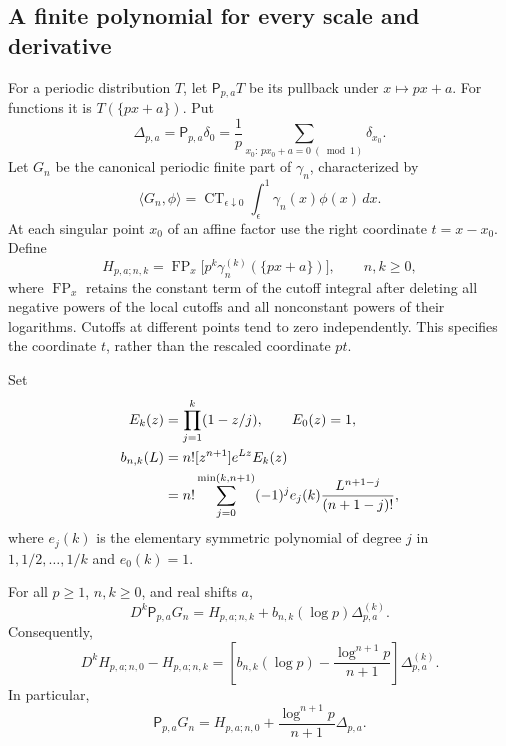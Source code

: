 \subsection{A finite polynomial for every scale and derivative}
For a periodic distribution $T$, let $\mathsf P_{p,a}T$ be its pullback
under $x\mapsto px+a$. For functions it is $T(\{px+a\})$. Put
\[
 \Delta_{p,a}=\mathsf P_{p,a}\delta_0
   =\frac1p\sum_{x_0:\,px_0+a=0\ (\bmod 1)}\delta_{x_0}.
\]
Let $G_n$ be the canonical periodic finite part of $\gamma_n$, characterized
by
\[
 \langle G_n,\phi\rangle
 =\operatorname{CT}_{\epsilon\downarrow0}
      \int_\epsilon^1\gamma_n(x)\phi(x)\,dx.
\]
At each singular point $x_0$ of an affine factor use the right coordinate
$t=x-x_0$. Define
\[
 H_{p,a;n,k}=\operatorname{FP}_x
       \bigl[p^k\gamma_n^{(k)}(\{px+a\})\bigr],\qquad n,k\geq0,
\]
where $\operatorname{FP}_x$ retains the constant term of the cutoff
integral after deleting all negative powers of the local cutoffs and all
nonconstant powers of their logarithms. Cutoffs at different points tend
to zero independently. This specifies the coordinate $t$, rather than
the rescaled coordinate $pt$.

Set
\begin{align}
 E_k(z)&=\prod_{j=1}^k(1-z/j),\qquad E_0(z)=1,\notag\\
 b_{n,k}(L)&=n![z^{n+1}]e^{Lz}E_k(z)\label{dil:bdef}\\
 &=n!\sum_{j=0}^{\min(k,n+1)}(-1)^j e_j(k)
                  \frac{L^{n+1-j}}{(n+1-j)!},\notag
\end{align}
where $e_j(k)$ is the elementary symmetric polynomial of degree $j$ in
$1,1/2,\ldots,1/k$ and $e_0(k)=1$.

\begin{theorem}
\label{dil:contact}
For all $p\geq1$, $n,k\geq0$, and real shifts $a$,
\begin{equation}\label{dil:contactformula}
 D^k\mathsf P_{p,a}G_n
 =H_{p,a;n,k}+b_{n,k}(\log p)\Delta_{p,a}^{(k)}.
\end{equation}
Consequently,
\begin{equation}\label{dil:commutator}
 D^kH_{p,a;n,0}-H_{p,a;n,k}
 =\left[b_{n,k}(\log p)-\frac{\log^{n+1}p}{n+1}\right]
       \Delta_{p,a}^{(k)}.
\end{equation}
In particular,
\begin{equation}\label{dil:scaleonly}
 \mathsf P_{p,a}G_n
 =H_{p,a;n,0}+\frac{\log^{n+1}p}{n+1}\Delta_{p,a}.
\end{equation}
\end{theorem}

